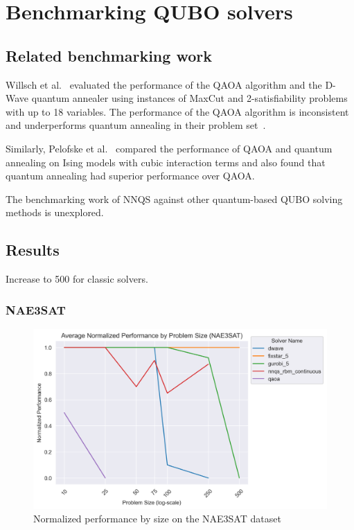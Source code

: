 \chapter{Benchmarking QUBO solvers}
\label{benchmark}

\section{Related benchmarking work}
Willsch et al.~\cite{b34} evaluated the performance of the QAOA algorithm and the D-Wave quantum annealer using instances of MaxCut and 2-satisfiability problems with up to 18 variables. The performance of the QAOA algorithm is inconsistent and underperforms quantum annealing in their problem set~\cite{b34}. 

Similarly, Pelofske et al.~\cite{b35} compared the performance of QAOA and quantum annealing on Ising models with cubic interaction terms and also found that quantum annealing had superior performance over QAOA. 

The benchmarking work of NNQS against other quantum-based QUBO solving methods is unexplored.

\section{Results}
Increase to 500 for classic solvers.

\subsection{NAE3SAT}
\begin{figure}[!h]
    \centering
    \includegraphics[width=1\linewidth]{images/nae3sat_normalized_performance_all.png}
    \caption{Normalized performance by size on the NAE3SAT dataset}
    \label{all-nae3sat-size}
\end{figure}

